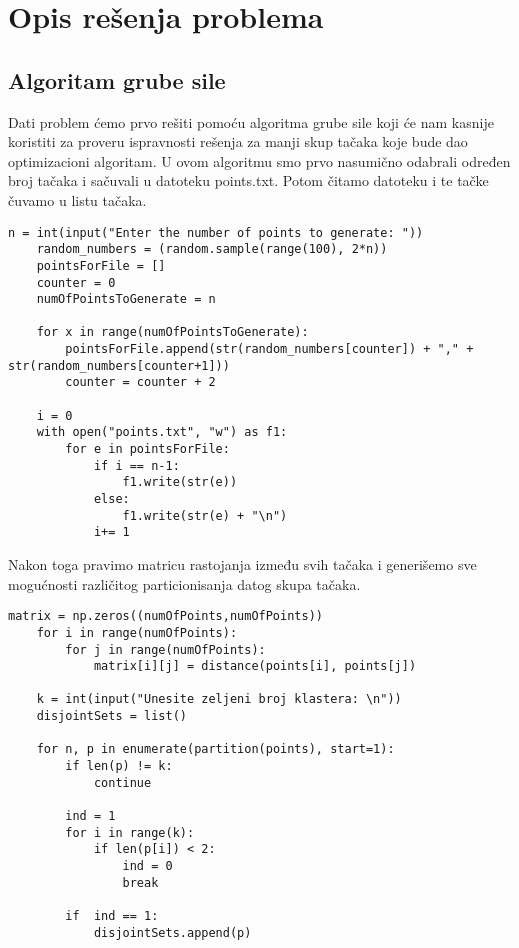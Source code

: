 \documentclass[a4paper]{article}
\begin{document}
\section{Opis rešenja problema}

\subsection{Algoritam grube sile}
Dati problem ćemo prvo rešiti pomoću algoritma grube sile koji će nam kasnije koristiti za proveru ispravnosti rešenja za manji skup tačaka koje bude dao optimizacioni algoritam. U ovom algoritmu smo prvo nasumično odabrali određen broj tačaka i sačuvali u datoteku points.txt. Potom čitamo datoteku i te tačke čuvamo u listu tačaka.

\begin{lstlisting}[title=Program 1: nasumično biranje tačaka i smeštanje u datoteku]
    n = int(input("Enter the number of points to generate: "))
    random_numbers = (random.sample(range(100), 2*n))
    pointsForFile = []
    counter = 0
    numOfPointsToGenerate = n

    for x in range(numOfPointsToGenerate):
        pointsForFile.append(str(random_numbers[counter]) + "," + str(random_numbers[counter+1]))
        counter = counter + 2

    i = 0
    with open("points.txt", "w") as f1:
        for e in pointsForFile:
            if i == n-1:
                f1.write(str(e))
            else:
                f1.write(str(e) + "\n")
            i+= 1
\end{lstlisting}

Nakon toga pravimo matricu rastojanja između svih tačaka i generišemo sve mogućnosti različitog particionisanja datog skupa tačaka.
\begin{lstlisting}[title=Program 2: Generisanje matrice rastojanja i partitivnih skupova]
    matrix = np.zeros((numOfPoints,numOfPoints))
    for i in range(numOfPoints):
        for j in range(numOfPoints):
            matrix[i][j] = distance(points[i], points[j])

    k = int(input("Unesite zeljeni broj klastera: \n"))
    disjointSets = list()
    
    for n, p in enumerate(partition(points), start=1):
        if len(p) != k:
            continue
        
        ind = 1
        for i in range(k):
            if len(p[i]) < 2:
                ind = 0
                break

        if  ind == 1:
            disjointSets.append(p)
\end{lstlisting}
\end{document}

